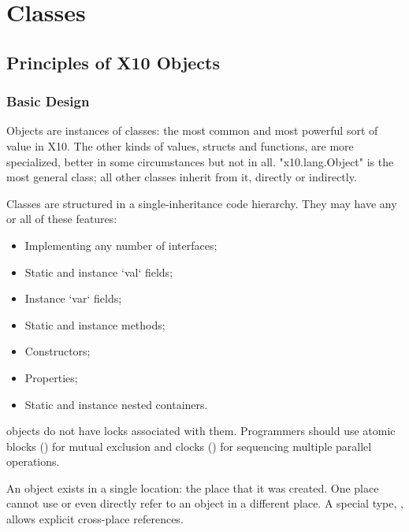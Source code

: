 \chapter{Classes}
\label{XtenClasses}
\label{ReferenceClasses}

\section{Principles of X10 Objects}\label{XtenObjects}

\subsection{Basic Design}

Objects are instances of classes: the most common and most powerful sort of
value in X10.  The other kinds of values, structs and functions, are more
specialized, better in some circumstances but not in all.
\xcd"x10.lang.Object" is the most general class; all other classes inherit
from it, directly or indirectly. 


Classes are structured in a single-inheritance code
hierarchy.   They may have any or all of these features: 
\begin{itemize}
\item Implementing any number of interfaces;
\item Static and instance \xcd`val` fields; 
\item Instance \xcd`var` fields; 
\item Static and instance methods;
\item Constructors;
\item Properties;
\item Static and instance nested containers.
\end{itemize}


\Xten{} objects do not have locks associated with them.
Programmers should use atomic blocks () for mutual
exclusion and clocks () for sequencing multiple parallel
operations.

An object exists in a single location: the place that it was created.  One
place cannot use or even directly refer to an object in a different place.   A
special type, , allows explicit cross-place references. 

